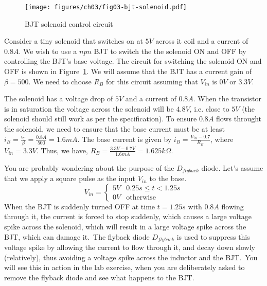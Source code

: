\begin{figure}[htbp]
    \centering
    \texttt{[image: figures/ch03/fig03-bjt-solenoid.pdf]}
    \caption{BJT solenoid control circuit}
    \label{fig:03-bjt-solenoid}
\end{figure}
\begin{boxedstuff}
    \begin{example}
        Consider a tiny solenoid that switches on at $5V$ across it coil and a current of $0.8A$. We wish to use  a $npn$ BJT to switch the the solenoid ON and OFF by controlling the BJT's base voltage. The circuit for switching the solenoid ON and OFF is shown in Figure~\ref{fig:03-bjt-solenoid}. We will assume that the BJT has a current gain of $\beta = 500$. We need to choose $R_B$ for this circuit assuming that $V_{in}$ is $0V$ or $3.3V$.

        The solenoid has a voltage drop of $5V$ and a current of $0.8A$. When the transistor is in saturation the voltage across the solenoid will be $4.8V$, i.e. close to $5V$ (the solenoid should still work as per the specification). To ensure $0.8A$ flows throught the solenoid, we need to ensure that the base current must be at least $i_B = \frac{i_C}{\beta} = \frac{0.8A}{500} = 1.6mA$. The base current is given by $i_B = \frac{V_{in} - 0.7}{R_B}$, where $V_{in} = 3.3V$. Thus, we have, $R_B = \frac{3.3V - 0.7V}{1.6mA} = 1.625k\Omega$.

        You are probably wondering about the purpose of the $D_{flyback}$ diode. Let's assume that we apply a square pulse as the input $V_{in}$ to the base. 
        \[ V_{in} = \begin{cases}
            5V & 0.25s \leq t < 1.25s \\
            0V & \text{otherwise}
        \end{cases}\]
        When the BJT is suddenly turned OFF at time $t=1.25s$ with $0.8A$ flowing through it, the current is forced to stop suddenly, which causes a large voltage spike across the solenoid, which will result in a large voltage spike across the BJT, which can damage it.\ The flyback diode $D_{flyback}$ is used to suppress this voltage spike by allowing the current to flow through it, and decay down slowly (relatively), thus avoiding a voltage spike across the inductor and the BJT.\ You will see this in action in the lab exercise, when you are deliberately asked to remove the flyback diode and see what happens to the BJT.\
    \end{example}
\end{boxedstuff}
